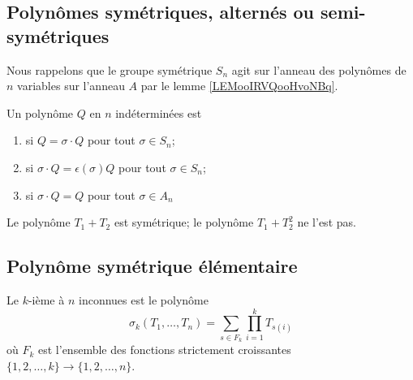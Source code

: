 \subsection{Polynômes symétriques, alternés ou semi-symétriques}


Nous rappelons que le groupe symétrique \( S_n\) agit sur l'anneau des polynômes de \( n\) variables sur l'anneau \( A\) par le lemme \ref{LEMooIRVQooHvoNBq}.

\begin{definition}
	Un polynôme \( Q\) en \( n\) indéterminées est
	\begin{enumerate}
		\item
		       si \( Q=\sigma\cdot Q\) pour tout \( \sigma\in S_n\);
		\item
		       si \( \sigma\cdot Q=\epsilon(\sigma)Q\) pour tout \( \sigma\in S_n\);
		\item
		       si \( \sigma\cdot Q=Q\) pour tout \( \sigma\in A_n\)
	\end{enumerate}
\end{definition}
Le polynôme \( T_1+T_2\) est symétrique; le polynôme \( T_1+T_2^2\) ne l'est pas.

\subsection{Polynôme symétrique élémentaire}

\begin{definition}  \label{DEFooTREUooZKoXeg}
	Le \( k\)-ième  à \( n\) inconnues est le polynôme
	\begin{equation}
		\sigma_k(T_1,\ldots, T_n)=\sum_{s\in F_k}\prod_{i=1}^kT_{s(i)}
	\end{equation}
	où \( F_k\) est l'ensemble des fonctions strictement croissantes \( \{ 1,2,\ldots, k \}\to\{ 1,2,\ldots, n \}\).
\end{definition}

